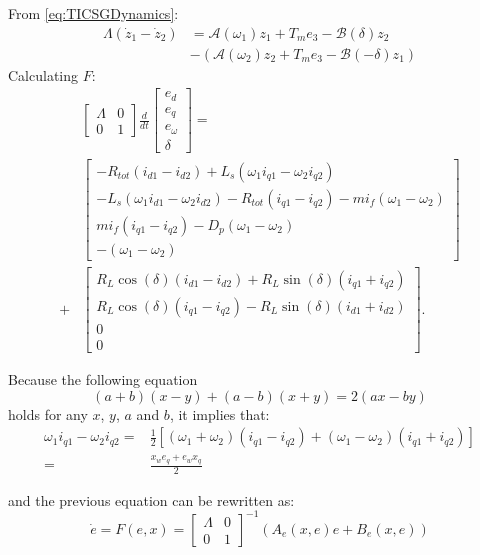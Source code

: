 \documentclass[letterpaper, 10 pt, conference]{ieeeconf}  %
\begin{document}
From \eqref{eq:TICSGDynamics}:
$$
\begin{aligned}
\Lambda(\dot{z}_{1}-\dot{z}_{2})&=\mathcal{A}(\omega_{1})z_{1}+T_{m}e_{3}-\mathcal{B}(\delta)z_{2}\\&-\left(\mathcal{A}(\omega_{2})z_{2}+T_{m}e_{3}-\mathcal{B}(-\delta)z_{1}\right)
\end{aligned}
$$
Calculating  $F$:
$$
\begin{aligned}
&  \left[\begin{array}{cc}
\varLambda & 0\\
0 & 1
\end{array}\right] \frac{d}{dt}\left[\begin{array}{c}
e_{d}\\
e_{q}\\
e_{\omega}\\
\delta
\end{array}\right]  =  \\ & \left[\begin{array}{c}
-R_{tot}(i_{d1}-i_{d2})+L_{s}(\omega_{1}i_{q1}-\omega_{2}i_{q2})\\
-L_{s}(\omega_{1}i_{d1}-\omega_{2}i_{d2})-R_{tot}(i_{q1}-i_{q2})-mi_{f}(\omega_{1}-\omega_{2})\\
mi_{f}(i_{q1}-i_{q2})-D_{p}(\omega_{1}-\omega_{2})\\
-(\omega_{1}-\omega_{2})
\end{array}\right]\\
 + & \left[\begin{array}{c}
R_{L}\cos(\delta)(i_{d1}-i_{d2})+R_{L}\sin(\delta)(i_{q1}+i_{q2})\\
R_{L}\cos(\delta)(i_{q1}-i_{q2})-R_{L}\sin(\delta)(i_{d1}+i_{d2})\\
0\\
0
\end{array}\right].
\end{aligned}
$$

Because the following equation   
$$(a+b)(x-y)+(a-b)(x+y)=2(ax-by)$$
holds for any $x$, $y$, $a$ and $b$, it implies that:
$$
\begin{aligned}
\omega_{1}i_{q1}-\omega_{2}i_{q2}= &\frac{1}{2}\left[(\omega_{1}+\omega_{2})(i_{q1}-i_{q2})+(\omega_{1}-\omega_{2})(i_{q1}+i_{q2})\right] \\ =&\frac{x_{w}e_{q}+e_{w}x_{q}}{2}
\end{aligned}
$$

and the previous equation can be rewritten as:
$$
\dot{e}  = F(e,x) =\left[\begin{array}{cc}
\varLambda & 0\\
0 & 1
\end{array}\right]^{-1}\left(A_e\left(x,e\right) e +B_e\left(x,e\right)  \right)
$$
\end{document}
